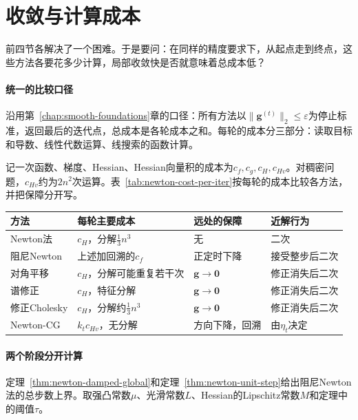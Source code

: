 \section{收敛与计算成本}
\label{sec:newton-cost}

前四节各解决了一个困难。于是要问：在同样的精度要求下，从起点走到终点，这些方法各要花多少计算，局部收敛快是否就意味着总成本低？

\paragraph{统一的比较口径}
沿用第~\ref{chap:smooth-foundations}章的口径：所有方法以$\lVert\bm{g}^{(t)}\rVert_2\leq\varepsilon$为停止标准，返回最后的迭代点，总成本是各轮成本之和。每轮的成本分三部分：读取目标和导数、线性代数运算、线搜索的函数计算。

记一次函数、梯度、Hessian、Hessian向量积的成本为$c_f,c_g,c_H,c_{Hv}$。对稠密问题，$c_{Hv}$约为$2n^2$次运算。表~\ref{tab:newton-cost-per-iter}按每轮的成本比较各方法，并把保障分开写。

\begin{BookInlineTable}
  \centering
  \small
  \begin{tabular}{@{}llll@{}}
    \toprule
    方法 & 每轮主要成本 & 远处的保障 & 近解行为 \\
    \midrule
    Newton法 & $c_H$，分解$\tfrac13n^3$ & 无 & 二次 \\
    阻尼Newton & 上述加回溯的$c_f$ & 正定时下降 & 接受整步后二次 \\
    对角平移 & $c_H$，分解可能重复若干次 & $\bm{g}\to\bm{0}$ & 修正消失后二次 \\
    谱修正 & $c_H$，特征分解 & $\bm{g}\to\bm{0}$ & 修正消失后二次 \\
    修正Cholesky & $c_H$，分解约$\tfrac13n^3$ & $\bm{g}\to\bm{0}$ & 修正消失后二次 \\
    Newton-CG & $k_tc_{Hv}$，无分解 & 方向下降，回溯 & 由$\eta_t$决定 \\
    \bottomrule
  \end{tabular}
  \caption{各方法单轮成本和收敛保障的比较，$k_t$是第$t$轮内层的Hessian向量积次数。“$\bm{g}\to\bm{0}$”需要定理~\ref{thm:newton-modified-global}的条件，“修正消失”要求解处Hessian正定且修正规则先试零修正。}
  \label{tab:newton-cost-per-iter}
\end{BookInlineTable}

\paragraph{两个阶段分开计算}
定理~\ref{thm:newton-damped-global}和定理~\ref{thm:newton-unit-step}给出阻尼Newton法的总步数上界。取强凸常数$\mu$、光滑常数$L$、Hessian的Lipschitz常数$M$和定理中的阈值$\tau$。

